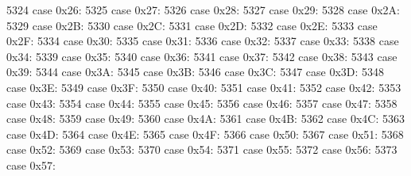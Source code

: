 \begin{DoxyCode}
5324             \textcolor{keywordflow}{case} 0x26:
5325             \textcolor{keywordflow}{case} 0x27:
5326             \textcolor{keywordflow}{case} 0x28:
5327             \textcolor{keywordflow}{case} 0x29:
5328             \textcolor{keywordflow}{case} 0x2A:
5329             \textcolor{keywordflow}{case} 0x2B:
5330             \textcolor{keywordflow}{case} 0x2C:
5331             \textcolor{keywordflow}{case} 0x2D:
5332             \textcolor{keywordflow}{case} 0x2E:
5333             \textcolor{keywordflow}{case} 0x2F:
5334             \textcolor{keywordflow}{case} 0x30:
5335             \textcolor{keywordflow}{case} 0x31:
5336             \textcolor{keywordflow}{case} 0x32:
5337             \textcolor{keywordflow}{case} 0x33:
5338             \textcolor{keywordflow}{case} 0x34:
5339             \textcolor{keywordflow}{case} 0x35:
5340             \textcolor{keywordflow}{case} 0x36:
5341             \textcolor{keywordflow}{case} 0x37:
5342             \textcolor{keywordflow}{case} 0x38:
5343             \textcolor{keywordflow}{case} 0x39:
5344             \textcolor{keywordflow}{case} 0x3A:
5345             \textcolor{keywordflow}{case} 0x3B:
5346             \textcolor{keywordflow}{case} 0x3C:
5347             \textcolor{keywordflow}{case} 0x3D:
5348             \textcolor{keywordflow}{case} 0x3E:
5349             \textcolor{keywordflow}{case} 0x3F:
5350             \textcolor{keywordflow}{case} 0x40:
5351             \textcolor{keywordflow}{case} 0x41:
5352             \textcolor{keywordflow}{case} 0x42:
5353             \textcolor{keywordflow}{case} 0x43:
5354             \textcolor{keywordflow}{case} 0x44:
5355             \textcolor{keywordflow}{case} 0x45:
5356             \textcolor{keywordflow}{case} 0x46:
5357             \textcolor{keywordflow}{case} 0x47:
5358             \textcolor{keywordflow}{case} 0x48:
5359             \textcolor{keywordflow}{case} 0x49:
5360             \textcolor{keywordflow}{case} 0x4A:
5361             \textcolor{keywordflow}{case} 0x4B:
5362             \textcolor{keywordflow}{case} 0x4C:
5363             \textcolor{keywordflow}{case} 0x4D:
5364             \textcolor{keywordflow}{case} 0x4E:
5365             \textcolor{keywordflow}{case} 0x4F:
5366             \textcolor{keywordflow}{case} 0x50:
5367             \textcolor{keywordflow}{case} 0x51:
5368             \textcolor{keywordflow}{case} 0x52:
5369             \textcolor{keywordflow}{case} 0x53:
5370             \textcolor{keywordflow}{case} 0x54:
5371             \textcolor{keywordflow}{case} 0x55:
5372             \textcolor{keywordflow}{case} 0x56:
5373             \textcolor{keywordflow}{case} 0x57:

\end{DoxyCode}
